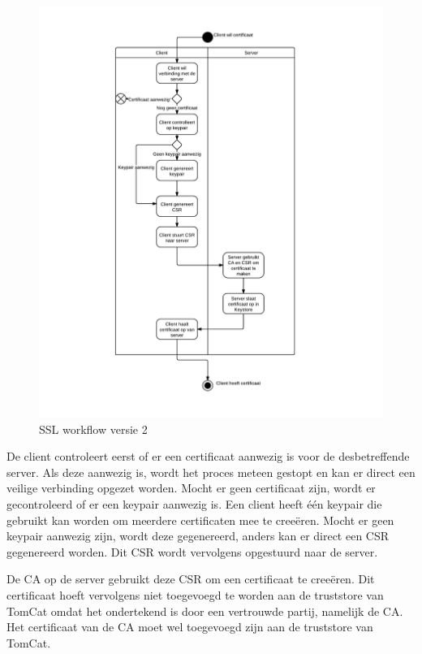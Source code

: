 \documentclass[]{article}
\begin{document}
\newpage

\begin{figure}[htpb]
   \begin{center}
     \includegraphics[height=0.86\textheight]{ssl_ad_2.pdf}
   \end{center}
   \caption{SSL workflow versie 2}
   \label{ssl_ad_2}
\end{figure}


De client controleert eerst of er een certificaat aanwezig is voor de
desbetreffende server. Als deze aanwezig is, wordt het proces meteen gestopt en
kan er direct een veilige verbinding opgezet worden. Mocht er geen certificaat
zijn, wordt er gecontroleerd of er een keypair aanwezig is. Een client heeft
\'e\'en keypair die gebruikt kan worden om meerdere certificaten mee te
cree\"eren. Mocht er geen keypair aanwezig zijn, wordt deze gegenereerd, anders
kan er direct een CSR gegenereerd worden. Dit CSR wordt vervolgens opgestuurd
naar de server.

De CA op de server gebruikt deze CSR om een certificaat te cree\"eren. Dit
certificaat hoeft vervolgens niet toegevoegd te worden aan de truststore van
TomCat omdat het ondertekend is door een vertrouwde partij, namelijk de CA. Het
certificaat van de CA moet wel toegevoegd zijn aan de truststore van TomCat.
\end{document}
